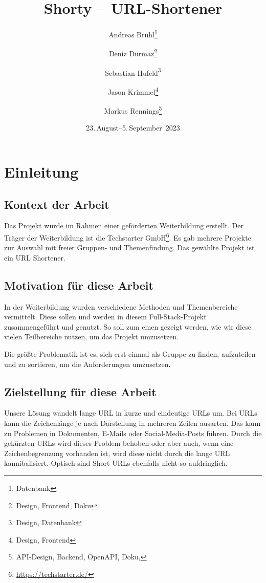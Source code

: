 \documentclass[a4paper,11pt,DIV=12,overfullrule=on]{scrreprt}%
\title{Shorty – URL-Shortener}
\subtitle{}
\author{Andreas Brühl\thanks{Datenbank} \and Deniz Durmaz\thanks{Design, Frontend, Doku} \and Sebastian Hufeld\thanks{Design, Datenbank} \and Jason Krimmel\thanks{Design, Frontend} \and Markus Rennings\thanks{API-Design, Backend, OpenAPI, Doku, \XeLaTeX}}
\date{23.\,August–5.\,September~2023}
\begin{document}
\raggedbottom%
\maketitle

\tableofcontents

\chapter{Einleitung}
\section{Kontext der Arbeit}
Das Projekt wurde im Rahmen einer geförderten Weiterbildung erstellt. Der Träger der Weiterbildung ist die Techstarter GmbH\footnote{\href{https://techstarter.de/}{https://techstarter.de/}}. Es gab mehrere Projekte zur Auswahl mit freier Gruppen- und Themenfindung. Das gewählte Projekt ist ein URL Shortener.

\section{Motivation für diese Arbeit}
In der Weiterbildung wurden verschiedene Methoden und Themenbereiche vermittelt. Diese sollen und werden in diesem Full-Stack-Projekt zusammengeführt und genutzt. So soll zum einen gezeigt werden, wie wir diese vielen Teilbereiche nutzen, um das Projekt umzusetzen.

Die größte Problematik ist es, sich erst einmal als Gruppe zu finden, aufzuteilen und zu sortieren, um die Anforderungen umzusetzen.

\section{Zielstellung für diese Arbeit}
Unsere Lösung wandelt lange \ac{URL} in kurze und eindeutige \ac{URL}s um. Bei \ac{URL}s kann die Zeichenlänge je nach Darstellung in mehreren Zeilen ausarten. Das kann zu Problemen in Dokumenten, E-Mails oder Social-Media-Posts führen. Durch die gekürzten \ac{URL}s wird dieses Problem behoben oder aber auch, wenn eine Zeichenbegrenzung vorhanden ist, wird diese nicht durch die lange \ac{URL} kannibalisiert. Optisch sind Short-\ac{URL}s ebenfalls nicht so aufdringlich.
\end{document}
